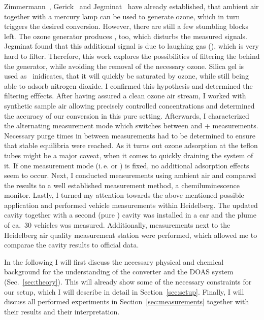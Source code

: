Zimmermann~\cite{zimmermann}, Gerick~\cite{gerick} and
Jegminat~\cite{bsc} have already established, that ambient air
together with a mercury lamp can be used to generate ozone, which in
turn triggers the desired conversion. However, there are still a few
stumbling blocks left. The ozone generator produces , too,
which disturbs the measured  signals. Jegminat found that
this additional signal is due to laughing gas (), which is
very hard to filter. Therefore, this work explores the possibilities
of filtering the  behind the generator, while avoiding the
removal of the necessary ozone. Silica gel is used
as~\cite{ozone-silica} inidicates, that it will quickly be saturated
by ozone, while still being able to adsorb nitrogen dioxide. I confirmed
this hypothesis and determined the filtering efffects. After having
assured a clean ozone air stream, I worked with synthetic sample air
allowing precisely controlled  concentrations and determined
the accuracy of our conversion in this pure 
setting. Afterwards, I characterized the alternating measurement mode
which switches between  and + measurements.
Necessary purge times in between measurements had to be determined to
ensure that stable equilibria were reached. As it turns out ozone
adsorption at the teflon tubes might be a major caveat, when it comes
to quickly draining the system of it. If one measurement mode
(i.\,e.  or ) is fixed, no additional adsorption
effects seem to occur. Next, I conducted measurements using ambient air
and compared the results to a well established   measurement
method, a chemiluminescence monitor. Lastly, I turned my attention
towards the above mentioned possible application and performed vehicle
measurements within Heidelberg. The updated cavity together with a
second (pure ) cavity was installed in a car and the plume of
ca.~30 vehicles was measured. Additionally, measurements next to the
Heidelberg air quality measurement station were performed, which allowed
me to comparae the cavity results to official data.

In the following I will first discuss the necessary physical and
chemical background for the understanding of the converter and the
DOAS system (Sec.~\ref{sec:theory}). This will already show some of
the necessary constraints for our setup, which I will describe in
detail in Section~\ref{sec:setup}. Finally, I will discuss all
performed experiments in Section~\ref{sec:measurements} together with
their results and their interpretation.

